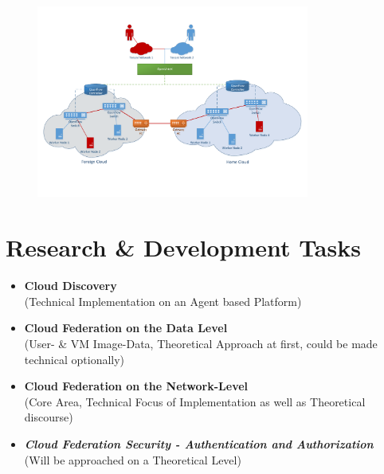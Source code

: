 \documentclass[a4paper,10pt]{article}
\begin{document}
\begin{figure}[h!]
 \centering
 \includegraphics[width=0.8\textwidth]{./gfx/networkFederation.pdf}
 \label{fig:federation_proposal}
\end{figure}


\newpage
\section{Research \& Development Tasks}
\begin{itemize}
	\item \textbf{Cloud Discovery} \\(Technical Implementation on an Agent based Platform)
	\item \textbf{Cloud Federation on the Data Level} \\(User- \& VM Image-Data, Theoretical Approach at first, could be made technical optionally)
	\item \textbf{Cloud Federation on the Network-Level} \\(Core Area, Technical Focus of Implementation as well as Theoretical discourse)
	\item \textit{\textbf{Cloud Federation Security - Authentication and Authorization}} \\(Will be approached on a Theoretical Level)
\end{itemize}
\end{document}
